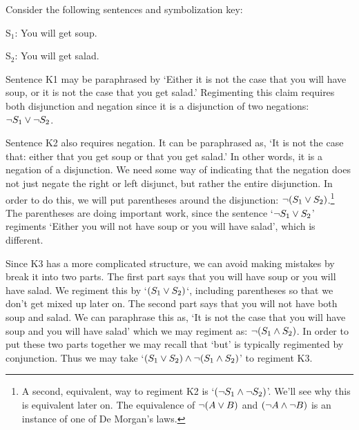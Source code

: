 Consider the following sentences and symbolization key:

\begin{earg}
\end{earg}

\begin{ekey}
\item[S$_1$:] You will get soup.
\item[S$_2$:] You will get salad.
\end{ekey}

Sentence K1 may be paraphrased by `Either it is not the case that you will have soup, or it is not the case that you get salad.' 
Regimenting this claim requires both disjunction and negation since it is a disjunction of two negations: $\neg S_1 \vee \neg S_2$.

Sentence K2 also requires negation.
It can be paraphrased as, `It is not the case that: either that you get soup or that you get salad.'
In other words, it is a negation of a disjunction.
We need some way of indicating that the negation does not just negate the right or left disjunct, but rather the entire disjunction.
In order to do this, we will put parentheses around the disjunction: $\neg (S_1 \vee S_2)$.\footnote{A second, equivalent, way to regiment K2 is `$(\neg S_1 \wedge \neg S_2)$'. We'll see why this is equivalent later on. The equivalence of $\neg (A \vee B)$ and $(\neg A \wedge \neg B)$ is an instance of one of De Morgan's laws.}
The parentheses are doing important work, since the sentence `$\neg S_1 \vee S_2$' regiments `Either you will not have soup or you will have salad', which is different.

Since K3 has a more complicated structure, we can avoid making mistakes by break it into two parts.
The first part says that you will have soup or you will have salad.
We regiment this by `$(S_1 \vee S_2)$`, including parentheses so that we don't get mixed up later on.
The second part says that you will not have both soup and salad.
We can paraphrase this as, `It is not the case that you will have soup and you will have salad' which we may regiment as: $\neg(S_1 \wedge S_2)$.
In order to put these two parts together we may recall that `but' is typically regimented by conjunction.
Thus we may take `$(S_1 \vee S_2) \wedge \neg(S_1 \wedge S_2)$' to regiment K3.



